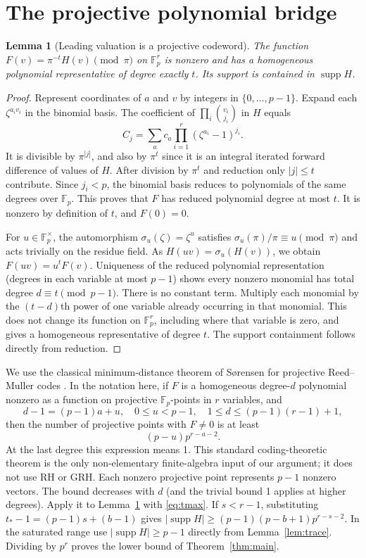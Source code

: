 \documentclass[11pt]{article}
\newtheorem{lemma}[theorem]{Lemma}
\theoremstyle{definition}\newtheorem{definition}[theorem]{Definition}
\theoremstyle{remark}\newtheorem{remark}[theorem]{Remark}
\newcommand{\F}{\mathbb F}
\newcommand{\supp}{\operatorname{supp}}
\begin{document}
\section{The projective polynomial bridge}
\begin{lemma}[Leading valuation is a projective codeword]\label{lem:poly}
The function $F(v)=\pi^{-t}H(v)\pmod\pi$ on $\F_p^r$ is nonzero and has a homogeneous polynomial representative of degree exactly $t$. Its support is contained in $\supp H$.
\end{lemma}
\begin{proof}
Represent coordinates of $a$ and $v$ by integers in $\{0,\ldots,p-1\}$. Expand each $\zeta^{a_i v_i}$ in the binomial basis. The coefficient of $\prod_i\binom{v_i}{j_i}$ in $H$ equals
\[
 C_j=\sum_a c_a\prod_{i=1}^r(\zeta^{a_i}-1)^{j_i}.
\]
It is divisible by $\pi^{|j|}$, and also by $\pi^t$ since it is an integral iterated forward difference of values of $H$. After division by $\pi^t$ and reduction only $|j|\le t$ contribute. Since $j_i<p$, the binomial basis reduces to polynomials of the same degrees over $\F_p$. This proves that $F$ has reduced polynomial degree at most $t$. It is nonzero by definition of $t$, and $F(0)=0$.

For $u\in\F_p^\times$, the automorphism $\sigma_u(\zeta)=\zeta^u$ satisfies $\sigma_u(\pi)/\pi\equiv u\pmod\pi$ and acts trivially on the residue field. As $H(uv)=\sigma_u(H(v))$, we obtain $F(uv)=u^t F(v)$. Uniqueness of the reduced polynomial representation (degrees in each variable at most $p-1$) shows every nonzero monomial has total degree $d\equiv t\pmod{p-1}$. There is no constant term. Multiply each monomial by the $(t-d)$th power of one variable already occurring in that monomial. This does not change its function on $\F_p^r$, including where that variable is zero, and gives a homogeneous representative of degree $t$. The support containment follows directly from reduction.
\end{proof}

We use the classical minimum-distance theorem of S\o rensen for projective Reed--Muller codes \cite{Sorensen,Ghorpade}. In the notation here, if $F$ is a homogeneous degree-$d$ polynomial nonzero as a function on projective $\F_p$-points in $r$ variables, and
\[
 d-1=(p-1)a+u,\quad 0\le u<p-1,\quad 1\le d\le (p-1)(r-1)+1,
\]
then the number of projective points with $F\ne0$ is at least
\begin{equation}\label{eq:prm}
 (p-u)p^{r-a-2}.
\end{equation}
At the last degree this expression means 1. This standard coding-theoretic theorem is the only non-elementary finite-algebra input of our argument; it does not use RH or GRH. Each nonzero projective point represents $p-1$ nonzero vectors. The bound decreases with $d$ (and the trivial bound 1 applies at higher degrees). Apply it to Lemma~\ref{lem:poly} with \eqref{eq:tmax}. If $s<r-1$, substituting $t_*-1=(p-1)s+(b-1)$ gives $|\supp H|\ge(p-1)(p-b+1)p^{r-s-2}$. In the saturated range use $|\supp H|\ge p-1$ directly from Lemma~\ref{lem:trace}. Dividing by $p^r$ proves the lower bound of Theorem~\ref{thm:main}.
\end{document}
